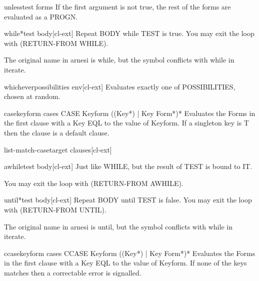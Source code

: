 \documentclass[10pt,english]{book}
\begin{document}
\begin{macro}{unless}{test \body forms}
  If the first argument is not true, the rest of the forms are
evaluated as a PROGN.
\end{macro}

\begin{macro}{while*}{test \body body}[cl-ext]
  Repeat BODY while TEST is true. You may exit the loop with
  (RETURN-FROM WHILE).
  \begin{devnote}
    The original name in arnesi is while, but the symbol conflicts
    with while in iterate.
  \end{devnote}
\end{macro}

\begin{macro}{whichever}{\rest possibilities \env env}[cl-ext]
  Evaluates exactly one of POSSIBILITIES, chosen at random.
\end{macro}

\begin{macro}{case}{keyform \body cases}
  CASE Keyform {({(Key*) | Key} Form*)}*
  Evaluates the Forms in the first clause with a Key EQL to the value of
  Keyform. If a singleton key is T then the clause is a default clause.
\end{macro}

\begin{macro}{list-match-case}{target \body clauses}[cl-ext]
  
\end{macro}

\begin{macro}{awhile}{test \body body}[cl-ext]
  Just like WHILE, but the result of TEST is bound to IT.

You may exit the loop with (RETURN-FROM AWHILE).
\end{macro}

\begin{macro}{until*}{test \body body}[cl-ext]
  Repeat BODY until TEST is false. You may exit the loop with
  (RETURN-FROM UNTIL).
  \begin{devnote}
    The original name in arnesi is until, but the symbol conflicts
    with while in iterate.
  \end{devnote}
\end{macro}

\begin{macro}{ccase}{keyform \body cases}
  CCASE Keyform {({(Key*) | Key} Form*)}*
  Evaluates the Forms in the first clause with a Key EQL to the value of
  Keyform. If none of the keys matches then a correctable error is
  signalled.
\end{macro}
\end{document}
